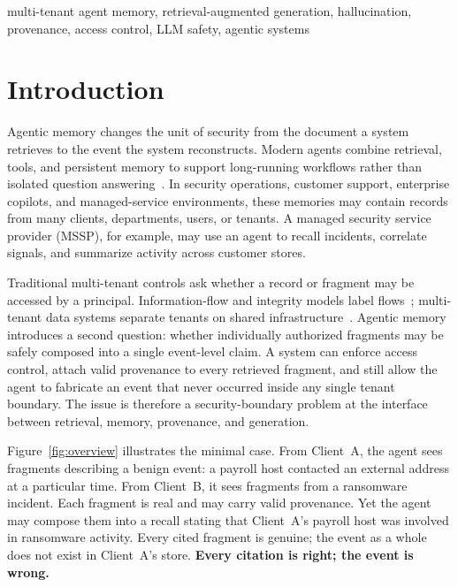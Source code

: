 \documentclass[conference,compsoc]{IEEEtran}
\begin{document}
\begin{IEEEkeywords}
multi-tenant agent memory, retrieval-augmented generation, hallucination, provenance, access control, LLM safety, agentic systems
\end{IEEEkeywords}

\section{Introduction}\label{sec:intro}

Agentic memory changes the unit of security from the document a system retrieves to the event the system reconstructs. Modern agents combine retrieval, tools, and persistent memory to support long-running workflows rather than isolated question answering~\cite{lewis2020rag,gao2023rag-survey,yao2023react,packer2023memgpt}. In security operations, customer support, enterprise copilots, and managed-service environments, these memories may contain records from many clients, departments, users, or tenants. A managed security service provider (MSSP), for example, may use an agent to recall incidents, correlate signals, and summarize activity across customer stores.

Traditional multi-tenant controls ask whether a record or fragment may be accessed by a principal. Information-flow and integrity models label flows~\cite{bell1973secure,biba1977integrity}; multi-tenant data systems separate tenants on shared infrastructure~\cite{aulbach2008multitenant,jin2024curator}. Agentic memory introduces a second question: whether individually authorized fragments may be safely composed into a single event-level claim. A system can enforce access control, attach valid provenance to every retrieved fragment, and still allow the agent to fabricate an event that never occurred inside any single tenant boundary. The issue is therefore a security-boundary problem at the interface between retrieval, memory, provenance, and generation.

Figure~\ref{fig:overview} illustrates the minimal case. From Client~A, the agent sees fragments describing a benign event: a payroll host contacted an external address at a particular time. From Client~B, it sees fragments from a ransomware incident. Each fragment is real and may carry valid provenance. Yet the agent may compose them into a recall stating that Client~A's payroll host was involved in ransomware activity. Every cited fragment is genuine; the event as a whole does not exist in Client~A's store. \textbf{Every citation is right; the event is wrong.}
\end{document}
